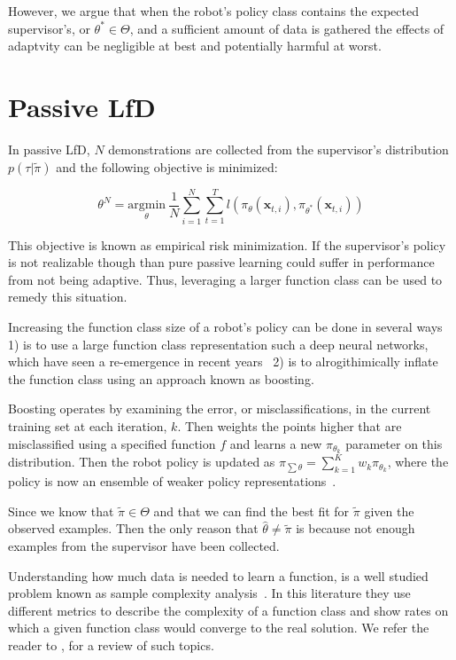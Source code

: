 \documentclass[10pt, conference]{ieeeconf}      %
\newcommand{\bx}{\mathbf{x}}
\begin{document}
However, we argue that when the robot's policy class contains the expected supervisor's, or  $\theta^* \in  \Theta$, and a sufficient amount of data is gathered the effects of adaptvity can be negligible at best and potentially harmful at worst. 

 

\section{Passive LfD}
In passive LfD, $N$ demonstrations are collected from the supervisor's distribution $p(\tau|\tilde{\pi})$ and the following objective is minimized: 

$$\theta^N = \underset{\theta}{\mbox{argmin}} \: \frac{1}{N} \sum^N_{i=1} \sum^T_{t=1} l(\pi_{\theta}(\bx_{t,i}), \pi_{\theta^*}(\bx_{t,i}))$$

This objective is known as empirical risk minimization. If the supervisor's policy is not realizable though than pure passive learning could suffer in performance from not being adaptive. Thus, leveraging a larger function class can be used to remedy this situation. 

Increasing the function class size of a robot's policy can be done in several ways 1) is to use a large function class representation such a deep neural networks, which have seen a re-emergence in recent years~\cite{levine2015end} 2) is to alrogithimically inflate the function class using an approach known as boosting.

Boosting operates by examining the error, or misclassifications, in the current training set at each iteration, $k$. Then weights the points higher that are misclassified using a specified function $f$ and learns a new $\pi_{\theta_k}$ parameter on this distribution.  Then the robot policy is updated as $\pi_{\sum \theta} = \sum^K_{k=1} w_k \pi_{\theta_k}$, where the policy is now an ensemble of weaker policy representations~\cite{mason1999boosting}.


Since we know that $\tilde{\pi} \in \Theta$ and that we can find the best fit for $\tilde{\pi}$ given the observed examples. Then the only reason that $\hat{\theta} \neq \tilde{\pi}$ is because not enough examples from the supervisor have been collected. 

Understanding how much data is needed to learn a function, is a well studied problem known as sample complexity analysis~\cite{anthony2009neural}. In this literature they use different metrics to describe the complexity of a function class and show rates on which a given function class would converge to the real solution. We refer the reader to \cite{vapnik2013nature}, for a review of such topics. 
\end{document}
